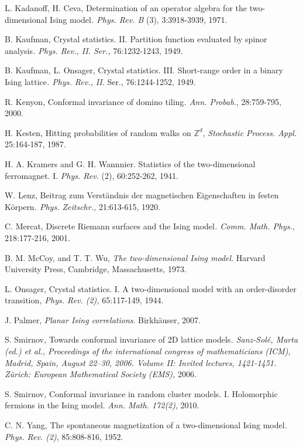 \documentclass[oneside,english]{amsart}
\numberwithin{equation}{section}
\numberwithin{figure}{section}
\theoremstyle{plain}
\theoremstyle{plain}
\theoremstyle{plain}
\theoremstyle{plain}
\theoremstyle{plain}
\theoremstyle{definition}
\theoremstyle{remark}
\begin{document}
\begin{thebibliography}{References}
L. Kadanoff, H. Ceva, Determination
of an operator algebra for the two-dimensional Ising model\emph{.
Phys. Rev. B} (3), 3:3918-3939, 1971.

B. Kaufman, Crystal statistics. II. Partition
function evaluated by spinor analysis\emph{. Phys. Rev., II. Ser.,}
76:1232-1243, 1949.

B. Kaufman, L. Onsager,\emph{
}Crystal statistics. III. Short-range order in a binary Ising lattice\emph{.
Phys. Rev., II.} Ser., 76:1244-1252, 1949.

R. Kenyon, Conformal invariance of domino
tiling\emph{. Ann. Probab.}, 28:759-795, 2000.

H. Kesten, Hitting probabilities of random
walks on $\mathbb{Z}^{d}$,\emph{ Stochastic Process. Appl.} 25:164-187,
1987.

H. A. Kramers and G. H. Wannnier.
Statistics of the two-dimensional ferromagnet. I.\emph{ Phys. Rev.
}(2), 60:252-262, 1941.

W. Lenz, Beitrag zum Verständnis der magnetischen
Eigenschaften in festen Körpern\emph{. Phys. Zeitschr.,} 21:613-615,
1920.

C. Mercat, Discrete Riemann surfaces and the
Ising model\emph{. Comm. Math. Phys., }218:177-216, 2001.

B. M. McCoy, and T. T. Wu, \emph{The two-dimensional
Ising model}. Harvard University Press, Cambridge, Massachusetts,
1973.

L. Onsager, Crystal statistics. I.\emph{
}A two-dimensional model with an order-disorder transition\emph{,
Phys. Rev. (2),} 65:117-149, 1944.

J. Palmer, \emph{Planar Ising correlations}.
Birkhäuser, 2007.

S. Smirnov\emph{, }Towards conformal invariance
of 2D lattice models\emph{. Sanz-Solé, Marta (ed.) et al., Proceedings
of the international congress of mathematicians (ICM), Madrid, Spain,
August 22--30, 2006. Volume II: Invited lectures, 1421-1451. Zürich:
European Mathematical Society (EMS),} 2006.

S. Smirnov\emph{, }Conformal invariance
in random cluster models. I. Holomorphic fermions in the Ising model.\emph{
Ann. Math. 172(2)}, 2010.

C. N. Yang, The spontaneous magnetization of
a two-dimensional Ising model\emph{. Phys. Rev. (2)}, 85:808-816,
1952.\end{thebibliography}
\end{document}

